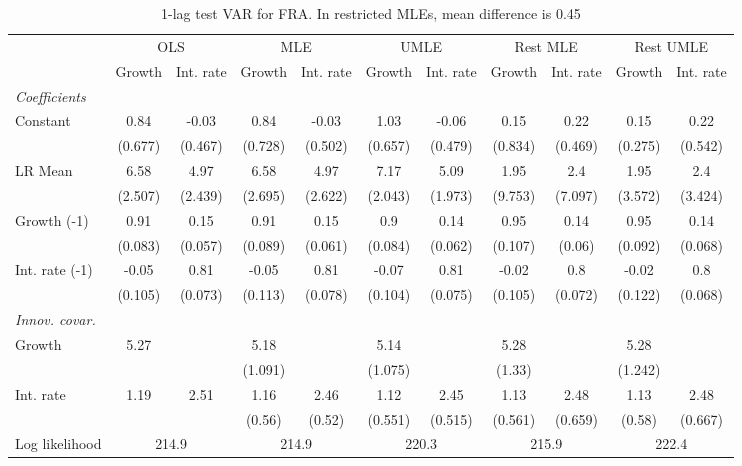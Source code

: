 \begin{table}[htbp] 
	\centering
	\begin{tabular}{@{\extracolsep{4pt}}lcccccccccc@{}}		\hline\hline
		 		 & \multicolumn{2}{c}{OLS} &\multicolumn{2}{c}{MLE} &\multicolumn{2}{c}{UMLE} &\multicolumn{2}{c}{Rest MLE} &\multicolumn{2}{c}{Rest UMLE} \\ 
 		 & Growth 	 & Int. rate 	 & Growth 	 & Int. rate 	 & Growth 	 & Int. rate 	 & Growth 	 & Int. rate 	 & Growth 	 & Int. rate\\\cline{2-3}\cline{4-5}\cline{6-7}\cline{8-9}\cline{10-11}
\rule{0pt}{4ex} 
 \emph{Coefficients} 	  		 & 		 & 		 & 		 & 		 & 		 & 		 & 		 & 		 & 		 &\\ 
\quad Constant 	 & 0.84 	 & -0.03 	 & 0.84 	 & -0.03 	 & 1.03 	 & -0.06 	 & 0.15 	 & 0.22 	 & 0.15 	 & 0.22	 \\ 
 		 & (0.677) 	 & (0.467) 	 & (0.728) 	 & (0.502) 	 & (0.657) 	 & (0.479) 	 & (0.834) 	 & (0.469) 	 & (0.275) 	 & (0.542) 	 \\ 
\quad LR Mean 	 & 6.58 	 & 4.97 	 & 6.58 	 & 4.97 	 & 7.17 	 & 5.09 	 & 1.95 	 & 2.4 	 & 1.95 	 & 2.4	 \\ 
 		 & (2.507) 	 & (2.439) 	 & (2.695) 	 & (2.622) 	 & (2.043) 	 & (1.973) 	 & (9.753) 	 & (7.097) 	 & (3.572) 	 & (3.424) 	 \\ 
\quad Growth (-1) 	 &0.91 	 & 0.15 	 & 0.91 	 & 0.15 	 & 0.9 	 & 0.14 	 & 0.95 	 & 0.14 	 & 0.95 	 & 0.14	 \\ 
 		 & (0.083) 	 & (0.057) 	 & (0.089) 	 & (0.061) 	 & (0.084) 	 & (0.062) 	 & (0.107) 	 & (0.06) 	 & (0.092) 	 & (0.068) 	 \\ 
\quad Int. rate (-1) 	 &-0.05 	 & 0.81 	 & -0.05 	 & 0.81 	 & -0.07 	 & 0.81 	 & -0.02 	 & 0.8 	 & -0.02 	 & 0.8	 \\ 
 		 & (0.105) 	 & (0.073) 	 & (0.113) 	 & (0.078) 	 & (0.104) 	 & (0.075) 	 & (0.105) 	 & (0.072) 	 & (0.122) 	 & (0.068) 	 \\ 
\rule{0pt}{4ex} \emph{Innov. covar.}  	 & 	 & 	 & 	 & 	 & 	 & 	 & 	 & 	 & 	 &\\ 
\quad Growth 	 &5.27 	 &  	 & 5.18 	 &  	 & 5.14 	 &  	 & 5.28 	 &  	 & 5.28 	 & 	 \\ 
 		 &  	 &  	 & (1.091) 	 &  	 & (1.075) 	 &  	 & (1.33) 	 &  	 & (1.242) 	 &  	 \\ 
\quad Int. rate 	 &1.19 	 & 2.51 	 & 1.16 	 & 2.46 	 & 1.12 	 & 2.45 	 & 1.13 	 & 2.48 	 & 1.13 	 & 2.48	 \\ 
 		 &  	 &  	 & (0.56) 	 & (0.52) 	 & (0.551) 	 & (0.515) 	 & (0.561) 	 & (0.659) 	 & (0.58) 	 & (0.667) 	 \\ 
 \hline \rule{0pt}{4ex} 
  Log likelihood 	 &\multicolumn{2}{c}{214.9} 	 & \multicolumn{2}{c}{214.9} 	 & \multicolumn{2}{c}{220.3} 	 & \multicolumn{2}{c}{215.9} 	 & \multicolumn{2}{c}{222.4}\\ 

 \hline 	\end{tabular}		\caption{1-lag test VAR for FRA. In restricted MLEs, mean difference is 0.45}
		\label{tab:FRA1lag}

\end{table}
